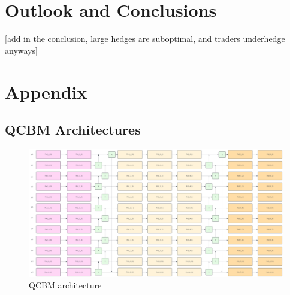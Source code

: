 \documentclass[12pt]{article}
\numberwithin{equation}{section}
\begin{document}
\newpage 
\section{Outlook and Conclusions}

[add in the conclusion, large hedges are suboptimal, and traders underhedge anyways]

\clearpage
\section{Appendix}
\subsection{QCBM Architectures}

\begin{figure}[h!]
    \centering
    \includegraphics[scale=0.3, angle=270, width=\textwidth-209]{qcbm1.png}
    \caption{QCBM architecture}
\end{figure}
\clearpage


\printbibliography
\end{document}
